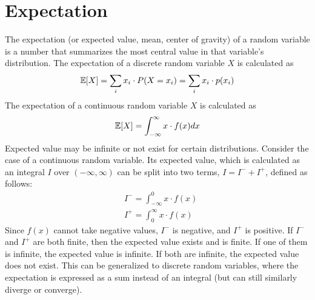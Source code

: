 \section{Expectation}
The expectation (or expected value, mean, center of gravity) of a random variable is a number that summarizes the most central value in that variable's distribution.
{
    The expectation of a discrete random variable $X$ is calculated as
    \begin{align*}
        \mathbb{E}[X] = \sum_i x_i \cdot P(X = x_i) = \sum_i x_i \cdot p(x_i)
    \end{align*}
    The expectation of a continuous random variable $X$ is calculated as
    \begin{align*}
        \mathbb{E}[X] = \int_{-\infty}^{\infty} x \cdot f(x) dx
    \end{align*}
}
Expected value may be infinite or not exist for certain distributions. Consider the case of a continuous random variable. Its expected value, which is calculated as an integral $I$ over $(-\infty, \infty)$ can be split into two terms, $I = I^- + I^+$, defined as follows:
\begin{align*}
    &I^- = \int_{-\infty}^{0} x \cdot f(x) \\
    &I^+ = \int_{0}^{\infty} x \cdot f(x)
\end{align*}
Since $f(x)$ cannot take negative values, $I^-$ is negative, and $I^+$ is positive. If $I^-$ and $I^+$ are both finite, then the expected value exists and is finite. If one of them is infinite, the expected value is infinite. If both are infinite, the expected value does not exist. This can be generalized to discrete random variables, where the expectation is expressed as a sum instead of an integral (but can still similarly diverge or converge).

